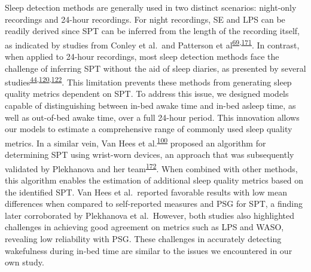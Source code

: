 \documentclass[
  10pt,
]{scrbook}
\begin{document}
Sleep detection methods are generally used in two distinct scenarios:
night-only recordings and 24-hour recordings. For night recordings, SE
and LPS can be readily derived since SPT can be inferred from the length
of the recording itself, as indicated by studies from Conley et al.~and
Patterson et
al\textsuperscript{\protect\hyperlink{ref-conley_agreement_2019}{69},\protect\hyperlink{ref-patterson_40_2023}{171}}.
In contrast, when applied to 24-hour recordings, most sleep detection
methods face the challenge of inferring SPT without the aid of sleep
diaries, as presented by several
studies\textsuperscript{\protect\hyperlink{ref-girschik_validation_2012}{44},\protect\hyperlink{ref-doherty_large_2017}{120},\protect\hyperlink{ref-anderson_assessment_2014}{122}}.
This limitation prevents these methods from generating sleep quality
metrics dependent on SPT. To address this issue, we designed models
capable of distinguishing between in-bed awake time and in-bed asleep
time, as well as out-of-bed awake time, over a full 24-hour period. This
innovation allows our models to estimate a comprehensive range of
commonly used sleep quality metrics. In a similar vein, Van Hees et
al.\textsuperscript{\protect\hyperlink{ref-van_hees_estimating_2018}{100}}
proposed an algorithm for determining SPT using wrist-worn devices, an
approach that was subsequently validated by Plekhanova and her
team\textsuperscript{\protect\hyperlink{ref-plekhanova_validation_2023}{172}}.
When combined with other methods, this algorithm enables the estimation
of additional sleep quality metrics based on the identified SPT. Van
Hees et al.~reported favorable results with low mean differences when
compared to self-reported measures and PSG for SPT, a finding later
corroborated by Plekhanova et al.~However, both studies also highlighted
challenges in achieving good agreement on metrics such as LPS and WASO,
revealing low reliability with PSG. These challenges in accurately
detecting wakefulness during in-bed time are similar to the issues we
encountered in our own study.
\end{document}
